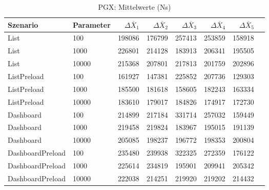 
\begin{table}[ht]
\setlength{\extrarowheight}{-1pt}
\centering
\caption{PGX: Mittelwerte (Ns)}
\begin{tabular}{llrrrrrr}
\toprule
Szenario & Parameter & ${\Delta \overline{X}_1}$ & ${\Delta \overline{X}_2}$ & ${\Delta \overline{X}_3}$ & ${\Delta \overline{X}_4}$ & ${\Delta \overline{X}_5}$ \\
\midrule
	List & 100 & 198086 & 176799 & 257413 & 253859 & 158918 \\
	List & 1000 & 226801 & 214128 & 183913 & 206341 & 195505 \\
	List & 10000 & 215368 & 207801 & 217813 & 201759 & 202896 \\
	ListPreload & 100 & 161927 & 147381 & 225852 & 207736 & 129303 \\
	ListPreload & 1000 & 185500 & 181618 & 158605 & 182243 & 163334 \\
	ListPreload & 10000 & 183610 & 179017 & 184826 & 174917 & 172730 \\
	Dashboard & 100 & 214899 & 217184 & 331714 & 257032 & 159449 \\
	Dashboard & 1000 & 219458 & 219824 & 183967 & 195015 & 191139 \\
	Dashboard & 10000 & 205085 & 198237 & 196772 & 198353 & 200804 \\
	DashboardPreload & 100 & 235480 & 239938 & 322325 & 272359 & 176122 \\
	DashboardPreload & 1000 & 225614 & 234819 & 195901 & 209941 & 205342 \\
	DashboardPreload & 10000 & 222038 & 214251 & 219920 & 219202 & 214432 \\
\bottomrule
\end{tabular}
\label{tab:mittelwerte_pgx_ns}
\end{table}
	